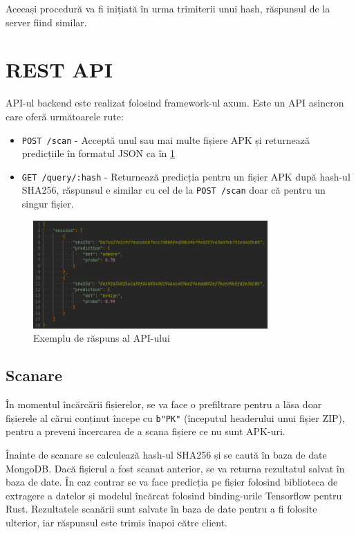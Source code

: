 \documentclass[12pt,a4paper]{report}
\begin{document}
Aceeași procedură va fi inițiată în urma trimiterii unui hash, răspunsul de la server fiind similar.

\section{REST API}
API-ul backend este realizat folosind framework-ul axum\cite{axum-framework}.
Este un API asincron care oferă următoarele rute:
\begin{itemize}
      \item \texttt{POST /scan} - Acceptă unul sau mai multe fișiere APK și returnează predicțiile în formatul JSON ca în \cref{fig:api_response}
      \item \texttt{GET /query/:hash} - Returnează predicția pentru un fișier APK după hash-ul SHA256, răspunsul e similar cu cel de la \texttt{POST /scan} doar că pentru un singur fișier.
\end{itemize}
\begin{figure}[H]
      \centering
      \includegraphics[width=0.8\textwidth]{visuals/api_response.png}
      \caption{Exemplu de răspuns al API-ului}
      \label{fig:api_response}
\end{figure}

\subsection{Scanare}
În momentul încărcării fișierelor, 
se va face o prefiltrare pentru a lăsa doar fișierele al cărui conținut începe 
cu \texttt{b"PK"} (începutul headerului unui fișier ZIP),
pentru a preveni încercarea de a scana fișiere ce nu sunt APK-uri.

Înainte de scanare se calculează hash-ul SHA256 și se caută în baza de date MongoDB\cite{mongodb}.
Dacă fișierul a fost scanat anterior, se va returna rezultatul salvat în baza de date.
În caz contrar se va face predicția pe fișier folosind biblioteca de extragere a datelor
și modelul încărcat folosind binding-urile Tensorflow pentru Rust. 
Rezultatele scanării sunt salvate în baza de date pentru a fi folosite ulterior,
iar răspunsul este trimis înapoi către client.
\end{document}
